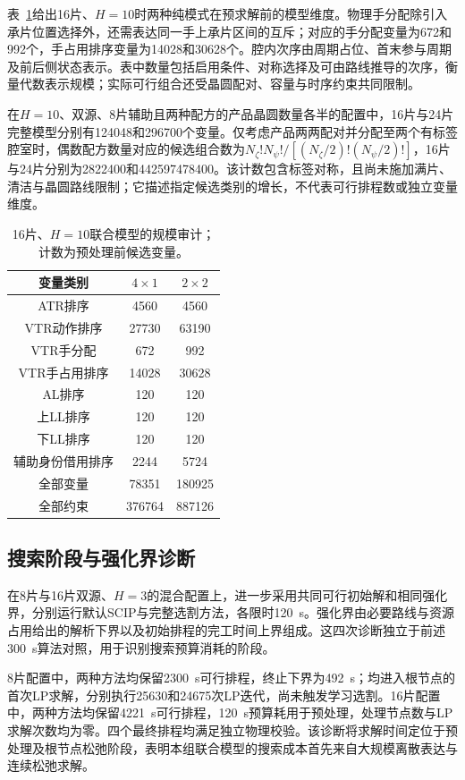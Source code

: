 \documentclass[final,5p,times,twocolumn]{elsarticle}
\begin{document}
表~\ref{tab:order-audit-cn}给出16片、$H=10$时两种纯模式在预求解前的模型维度。物理手分配除引入承片位置选择外，还需表达同一手上承片区间的互斥；对应的手分配变量为672和992个，手占用排序变量为14028和30628个。腔内次序由周期占位、首末参与周期及前后侧状态表示。表中数量包括启用条件、对称选择及可由路线推导的次序，衡量代数表示规模；实际可行组合还受晶圆配对、容量与时序约束共同限制。

在$H=10$、双源、8片辅助且两种配方的产品晶圆数量各半的配置中，16片与24片完整模型分别有124048和296700个变量。仅考虑产品两两配对并分配至两个有标签腔室时，偶数配方数量对应的候选组合数为$N_{\zeta}!N_{\psi}!/[(N_{\zeta}/2)!(N_{\psi}/2)!]$，16片与24片分别为2822400和442597478400。该计数包含标签对称，且尚未施加满片、清洁与晶圆路线限制；它描述指定候选类别的增长，不代表可行排程数或独立变量维度。

\begin{table}[!t]\centering\scriptsize\setlength{\tabcolsep}{4pt}
\caption{16片、$H=10$联合模型的规模审计；计数为预处理前候选变量。}
\label{tab:order-audit-cn}
\begin{tabular}{ccc}\toprule
变量类别 & $4\times1$ & $2\times2$\\\midrule
ATR排序 & 4560 & 4560\\
VTR动作排序 & 27730 & 63190\\
VTR手分配 & 672 & 992\\
VTR手占用排序 & 14028 & 30628\\
AL排序 & 120 & 120\\
上LL排序 & 120 & 120\\
下LL排序 & 120 & 120\\
辅助身份借用排序 & 2244 & 5724\\
全部变量 & 78351 & 180925\\
全部约束 & 376764 & 887126\\
\bottomrule\end{tabular}\end{table}



\subsection{搜索阶段与强化界诊断}

在8片与16片双源、$H=3$的混合配置上，进一步采用共同可行初始解和相同强化界，分别运行默认SCIP与完整选割方法，各限时120~s。强化界由必要路线与资源占用给出的解析下界以及初始排程的完工时间上界组成。这四次诊断独立于前述300~s算法对照，用于识别搜索预算消耗的阶段。

8片配置中，两种方法均保留2300~s可行排程，终止下界为492~s；均进入根节点的首次LP求解，分别执行25630和24675次LP迭代，尚未触发学习选割。16片配置中，两种方法均保留4221~s可行排程，120~s预算耗用于预处理，处理节点数与LP求解次数均为零。四个最终排程均满足独立物理校验。该诊断将求解时间定位于预处理及根节点松弛阶段，表明本组联合模型的搜索成本首先来自大规模离散表达与连续松弛求解。
\end{document}
